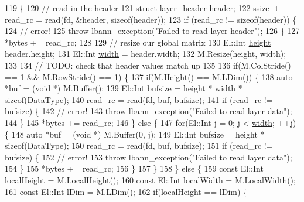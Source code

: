 \begin{DoxyCode}
119                                                                               \{
120   \textcolor{comment}{// read in the header}
121   \textcolor{keyword}{struct }\hyperlink{structlayer__header}{layer\_header} header;
122   ssize\_t read\_rc = read(fd, &header, \textcolor{keyword}{sizeof}(header));
123   \textcolor{keywordflow}{if} (read\_rc != \textcolor{keyword}{sizeof}(header)) \{
124     \textcolor{comment}{// error!}
125     \textcolor{keywordflow}{throw} lbann\_exception(\textcolor{stringliteral}{"Failed to read layer header"});
126   \}
127   *bytes += read\_rc;
128 
129   \textcolor{comment}{// resize our global matrix}
130   El::Int \hyperlink{structlayer__header_ad986e4b92e5b455e066fd349725c6bd9}{height} = header.height;
131   El::Int \hyperlink{structlayer__header_af1f45c9c74db048ea424114418f22d50}{width}  = header.width;
132   M.Resize(height, width);
133 
134   \textcolor{comment}{// TODO: check that header values match up}
135 
136   \textcolor{keywordflow}{if}(M.ColStride() == 1 && M.RowStride() == 1) \{
137     \textcolor{keywordflow}{if}(M.Height() == M.LDim()) \{
138       \textcolor{keyword}{auto} *buf = (\textcolor{keywordtype}{void} *) M.Buffer();
139       El::Int bufsize = height * width * \textcolor{keyword}{sizeof}(DataType);
140       read\_rc = read(fd, buf, bufsize);
141       \textcolor{keywordflow}{if} (read\_rc != bufsize) \{
142         \textcolor{comment}{// error!}
143         \textcolor{keywordflow}{throw} lbann\_exception(\textcolor{stringliteral}{"Failed to read layer data"});
144       \}
145       *bytes += read\_rc;
146     \} \textcolor{keywordflow}{else} \{
147       \textcolor{keywordflow}{for}(El::Int j = 0; j < \hyperlink{structlayer__header_af1f45c9c74db048ea424114418f22d50}{width}; ++j) \{
148         \textcolor{keyword}{auto} *buf = (\textcolor{keywordtype}{void} *) M.Buffer(0, j);
149         El::Int bufsize = height * \textcolor{keyword}{sizeof}(DataType);
150         read\_rc = read(fd, buf, bufsize);
151         \textcolor{keywordflow}{if} (read\_rc != bufsize) \{
152           \textcolor{comment}{// error!}
153           \textcolor{keywordflow}{throw} lbann\_exception(\textcolor{stringliteral}{"Failed to read layer data"});
154         \}
155         *bytes += read\_rc;
156       \}
157     \}
158   \} \textcolor{keywordflow}{else} \{
159     \textcolor{keyword}{const} El::Int localHeight = M.LocalHeight();
160     \textcolor{keyword}{const} El::Int localWidth = M.LocalWidth();
161     \textcolor{keyword}{const} El::Int lDim = M.LDim();
162     \textcolor{keywordflow}{if}(localHeight == lDim) \{

\end{DoxyCode}
